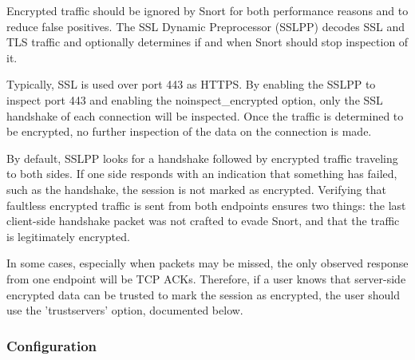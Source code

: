 \documentclass[english]{report}
\begin{document}
Encrypted traffic should be ignored by Snort for both performance reasons and
to reduce false positives.  The SSL Dynamic Preprocessor (SSLPP) decodes SSL
and TLS traffic and optionally determines if and when Snort should stop
inspection of it.

Typically, SSL is used over port 443 as HTTPS.  By enabling the SSLPP to
inspect port 443 and enabling the noinspect\_encrypted option, only the SSL
handshake of each connection will be inspected.  Once the traffic is determined
to be encrypted, no further inspection of the data on the connection is made.

By default, SSLPP looks for a handshake followed by encrypted traffic traveling
to both sides.  If one side responds with an indication that something has
failed, such as the handshake, the session is not marked as encrypted.
Verifying that faultless encrypted traffic is sent from both endpoints ensures
two things: the last client-side handshake packet was not crafted to evade
Snort, and that the traffic is legitimately encrypted.

In some cases, especially when packets may be missed, the only observed
response from one endpoint will be TCP ACKs.  Therefore, if a user knows that
server-side encrypted data can be trusted to mark the session as encrypted, the
user should use the 'trustservers' option, documented below.

\subsubsection{Configuration}
\end{document}

